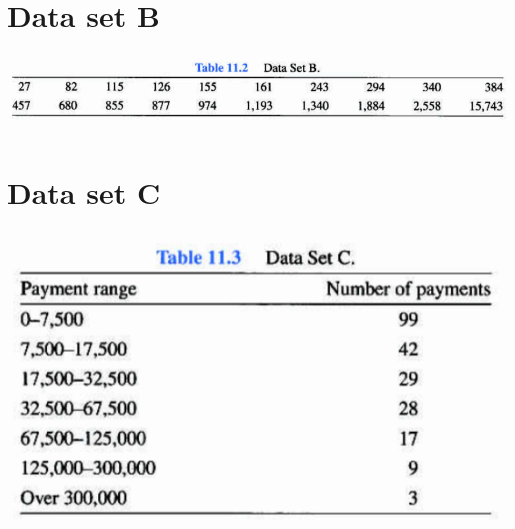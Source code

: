 \documentclass[12pt, french]{report}
\begin{document}
\section{Data set B}
\begin{center}
\includegraphics[scale=0.5]{src/Data-Set-B.png}
\end{center}


\section{Data set C}
\begin{center}
\includegraphics[scale=0.5]{src/Data-Set-C.png}
\end{center}
\end{document}
